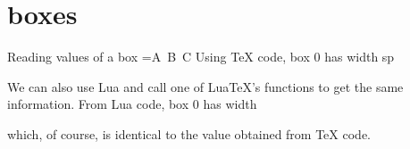 \section{boxes}

\begin{texexample}{Reading values of a box}{}
\bgroup
{}=\hbox{A\hskip 5pt B\hskip 10pt C}
\noindent Using \TeX{} code, box 0 has width \number{}\relax \space sp\par
\noindent We can also use Lua and call one of Lua\TeX's functions to get the same
information.\vskip10mm
\noindent From Lua code, box 0 has width 

 which, of course, is identical to the value obtained from \TeX{} code.

\egroup
\end{texexample}




